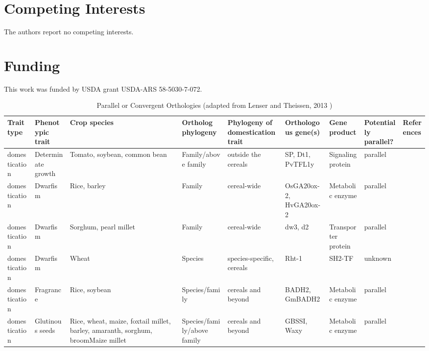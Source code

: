 \documentclass[12pt]{article}
\begin{document}
\section*{Competing Interests}
The authors report no competing interests.

\section*{Funding}
This work was funded by USDA grant USDA-ARS 58-5030-7-072.




\begin{table}
\begin{center}
\caption{Parallel or Convergent Orthologies (adapted from Lenser and Theissen, 2013 \citep{Lenser2013})} \label{tab:Ortho}
\fontsize{7}{8}\selectfont
\begin{tabular}{C{1.5cm}G{2.5cm}C{3.10cm}C{3.2cm}C{2.3cm}G{3.5cm}G{2.1cm}C{1.3cm}G{1.5cm}}
\\\toprule
{\bf Trait type} & {\bf Phenotypic trait} &{\bf Crop species} & {\bf Ortholog phylogeny} & {\bf Phylogeny of domestication trait} & {\bf Orthologous gene(s)} & {\bf Gene product} & {\bf Potentially parallel?} & {\bf References} \\\toprule
 domestication & Determinate growth &Tomato, soybean, common bean & Family/above family & outside the cereals & SP, Dt1, PvTFL1y & Signaling protein & parallel & \citep{Doebley2006, Repinski2012, Liu2010, Kwak2012, Tian2010}\\
 domestication & Dwarfism &Rice, barley & Family & cereal-wide & OsGA20ox-2, HvGA20ox-2 & Metabolic enzyme & parallel & \citep{Asano2007, Asano2011, Jia2009}\\
 domestication & Dwarfism &Sorghum, pearl millet & Family & cereal-wide & dw3, d2 & Transporter protein & parallel & \citep{Multani2003,Parvathaneni2013}\\
 domestication & Dwarfism &Wheat & Species & species-specific, cereals & Rht-1 & SH2-TF & unknown & \citep{Doebley2006}\\
 domestication & Fragrance &Rice, soybean & Species/family & cereals and beyond & BADH2, GmBADH2 & Metabolic enzyme & parallel & \citep{Kovach2009, Juwattanasomran2010}\\
 domestication & Glutinous seeds &Rice, wheat, maize, foxtail millet, barley, amaranth, sorghum, broomMaize millet & Species/family/above family & cereals and beyond & GBSSI, Waxy & Metabolic enzyme & parallel & \cite{Jeon2010, Fan2008, Kawahigashi2013, Kawase2005, Hunt2012, Park2011}\\

\end{tabular}
\end{center}
\end{table}
\end{document}
